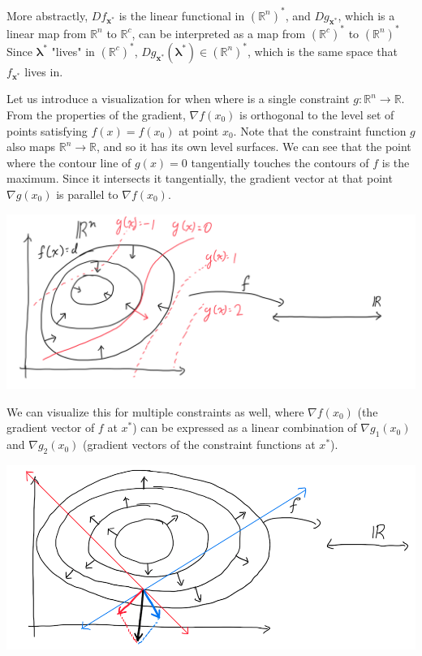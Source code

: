   More abstractly, $D f_{\mathbf{x}^*}$ is the linear functional in $(\mathbb{R}^n)^*$, and $D g_{\mathbf{x}^*}$, which is a linear map from $\mathbb{R}^n$ to $\mathbb{R}^c$, can be interpreted as a map from $(\mathbb{R}^c)^*$ to $(\mathbb{R}^n)^*$ Since $\boldsymbol{\lambda}^*$ "lives" in $(\mathbb{R}^c)^*$, $D g_{\mathbf{x}^*}(\boldsymbol{\lambda}^*) \in (\mathbb{R}^n)^*$, which is the same space that $f_{\mathbf{x}^*}$ lives in. 


  Let us introduce a visualization for when where is a single constraint $g: \mathbb{R}^n \longrightarrow \mathbb{R}$. From the properties of the gradient, $\nabla f(x_0)$ is orthogonal to the level set of points satisfying $f(x) = f(x_0)$ at point $x_0$. Note that the constraint function $g$ also maps $\mathbb{R}^n \longrightarrow \mathbb{R}$, and so it has its own level surfaces. We can see that the point where the contour line of $g(x) = 0$ tangentially touches the contours of $f$ is the maximum. Since it intersects it tangentially, the gradient vector at that point $\nabla g(x_0)$ is parallel to $\nabla f(x_0)$. 
  \begin{center}
      \includegraphics[scale=0.22]{img/Lagrange_Multiplier_Single_Constraint.PNG}
  \end{center}
  We can visualize this for multiple constraints as well, where $\nabla f(x_0)$ (the gradient vector of $f$ at $x^*$) can be expressed as a linear combination of $\nabla g_1 (x_0)$ and $\nabla g_2 (x_0)$ (gradient vectors of the constraint functions at $x^*$). 
  \begin{center}
      \includegraphics[scale=0.27]{img/Lagrange_Multiplier_Multiple_Constraints.PNG}
  \end{center}

